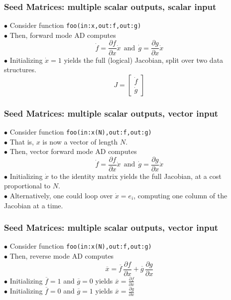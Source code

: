 \documentclass[compact,12pt]{beamer}
\newcommand{\prtl}[2]{\frac{\partial #1}{\partial #2}}
\begin{document}
\begin{frame}
\large\frametitle{Seed Matrices: multiple scalar outputs, scalar input}
$\bullet$ Consider function \texttt{foo(in:x,out:f,out:g)}\\[0.5em]
$\bullet$ Then, forward mode AD computes
$$
\Dot{f} = \prtl{f}{x}\Dot{x}\ \ \mbox{and}\ \ \Dot{g} = \prtl{g}{x}\Dot{x}
$$
$\bullet$ Initializing $\Dot{x} = 1$  yields the full (logical) Jacobian, split over two data structures.
$$
J = \left[ \begin{array}{c}
     \Dot{f} \\
     \Dot{g} 
\end{array} \right]
$$
\end{frame}

\begin{frame}
\large\frametitle{Seed Matrices: multiple scalar outputs, vector input}
$\bullet$ Consider function \texttt{foo(in:x(N),out:f,out:g)}\\
$\bullet$ That is, $x$ is now a vector of length $N$.\\
$\bullet$ Then, vector forward mode AD computes
$$
\Dot{f} = \prtl{f}{x}\Dot{x}\ \ \mbox{and}\ \ \Dot{g} = \prtl{g}{x}\Dot{x}
$$
$\bullet$ Initializing $\Dot{x}$ to the identity matrix yields the full Jacobian, at a cost proportional to $N$.\\
$\bullet$ Alternatively, one could loop over $\Dot{x} = e_i$, computing one column of the Jacobian at a time.
\end{frame}

\begin{frame}
\large\frametitle{Seed Matrices: multiple scalar outputs, vector input}
$\bullet$ Consider function \texttt{foo(in:x(N),out:f,out:g)}\\[0.5em]
$\bullet$ Then, reverse mode AD computes
$$
\overline{x} = \overline{f}\,\prtl{f}{x} + \overline{g}\,\prtl{g}{x}
$$
$\bullet$ Initializing $\overline{f} = 1$ and $\overline{g} = 0$ yields $\overline{x} = \prtl{f}{x}$\\
$\bullet$ Initializing $\overline{f} = 0$ and $\overline{g} = 1$ yields $\overline{x} = \prtl{g}{x}$\\
\end{frame}
\end{document}
